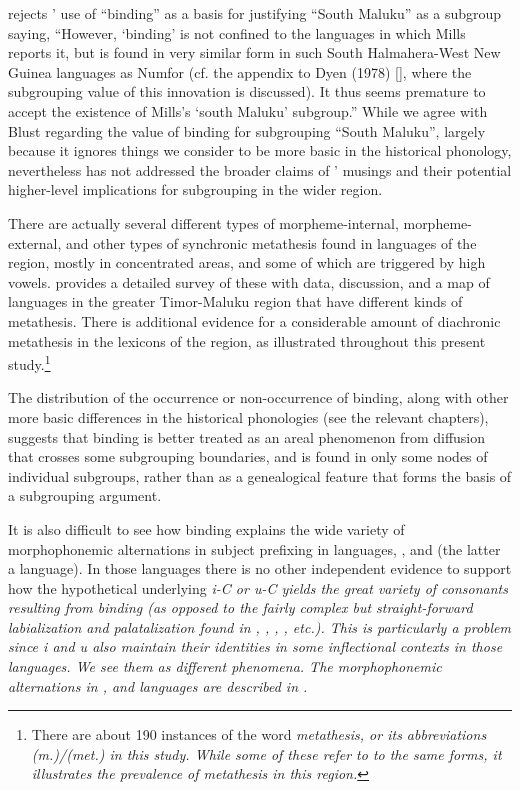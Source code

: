 \citet[276]{Blust1993} rejects \citeauthor{Mills1991}’ use of ``binding'' as a basis
for justifying “South Maluku” as a subgroup saying,
“However, ‘binding’ is not confined to the languages in which
Mills reports it, but is found in very similar form in such South Halmahera-West
New Guinea languages as Numfor (cf.
the appendix to Dyen (1978) [\citealp{Dyen1978a}],
where the subgrouping value of this innovation is discussed).
It thus seems premature to accept the existence of Mills’s ‘south
Maluku’ subgroup.” 
While we agree with Blust regarding the value of binding for
subgrouping “South Maluku”,
largely because it ignores things we consider to be more basic
in the historical phonology,
nevertheless \citeauthor{Blust1993} has
not addressed the broader claims of \citeauthor{Mills1991}’
musings and their potential higher-level implications for subgrouping
in the wider region.

There are actually several different types of morpheme-internal,
morpheme-external, and other types of synchronic metathesis found
in languages of the region,
mostly in concentrated areas,
and some of which are triggered by high vowels.
\citet[20--76]{Edwards2020} provides a detailed survey of these
with data, discussion, and a map of languages in the greater Timor-Maluku
region that have different kinds of metathesis.
There is additional evidence for a considerable amount of diachronic
metathesis in the lexicons of the region,
as illustrated throughout this present study.\footnote{
	There are about 190 instances of the word \it{metathesis},
	or its abbreviations \it{(m.)/(met.)} in this study.
	While some of these refer to to the same forms,
	it illustrates the prevalence of metathesis in this region.}

The distribution of the occurrence or non-occurrence of binding,
along with other more basic differences in the historical phonologies
(see the relevant chapters),
suggests that binding is better treated as an areal phenomenon
from diffusion that crosses some subgrouping boundaries,
and is found in only some nodes of individual subgroups,
rather than as a genealogical feature that
forms the basis of a subgrouping argument.

It is also difficult to see how binding explains the wide variety
of morphophonemic alternations in subject prefixing in 
languages, , and  (the latter a  language).
In those languages there is no other independent evidence to
support how the hypothetical underlying \it{i}-C or \it{u}-C
yields the great variety of consonants resulting from binding
(as opposed to the fairly complex but straight-forward labialization
and palatalization found in ,
, , , etc.).
This is particularly a problem since \it{i}
and \it{u} also maintain their identities in some inflectional
contexts in those languages.
We see them as different phenomena.
The morphophonemic alternations in ,
 and  languages are described in .

